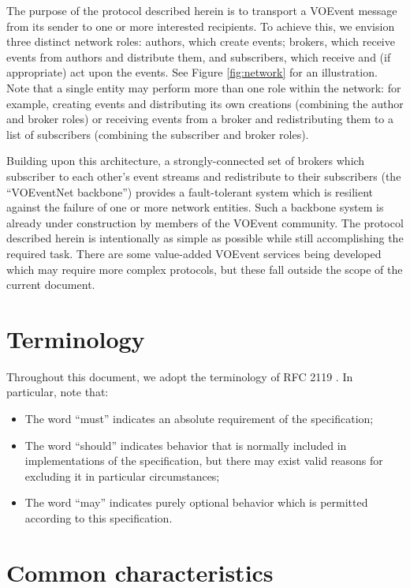 \documentclass[a4paper,11pt]{ivoa}
\begin{document}
The purpose of the protocol described herein is to transport a VOEvent message
from its sender to one or more interested recipients. To achieve this, we
envision three distinct network roles: authors, which create events; brokers,
which receive events from authors and distribute them, and subscribers, which
receive and (if appropriate) act upon the events. See Figure \ref{fig:network}
for an illustration. Note that a single entity may perform more than one role
within the network: for example, creating events and distributing its own
creations (combining the author and broker roles) or receiving events from a
broker and redistributing them to a list of subscribers (combining the
subscriber and broker roles).

Building upon this architecture, a strongly-connected set of brokers which
subscriber to each other's event streams and redistribute to their subscribers
(the ``VOEventNet backbone'') provides a fault-tolerant system which is
resilient against the failure of one or more network entities. Such a backbone
system is already under construction by members of the VOEvent community.  The
protocol described herein is intentionally as simple as possible while still
accomplishing the required task. There are some value-added VOEvent services
being developed which may require more complex protocols, but these fall
outside the scope of the current document.

\section{Terminology}

Throughout this document, we adopt the terminology of RFC 2119
\citep{Bradner:1997}. In particular, note that:

\begin{itemize}
    \item{The word ``must'' indicates an absolute requirement of the
    specification;}

    \item{The word ``should'' indicates behavior that is normally included in
    implementations of the specification, but there may exist valid reasons
    for excluding it in particular circumstances;}

    \item{The word ``may'' indicates purely optional behavior which is
    permitted according to this specification.}
\end{itemize}

\section{Common characteristics}
\end{document}
